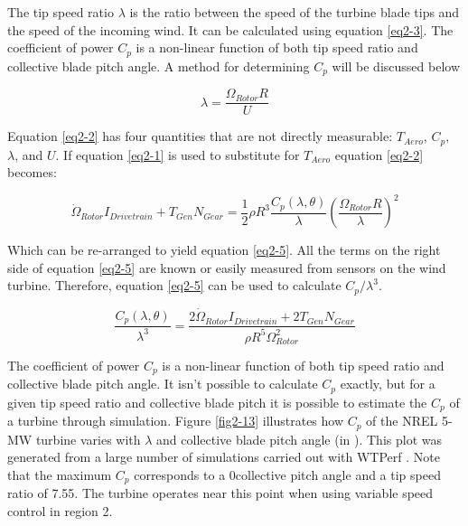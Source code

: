 The tip speed ratio $\lambda$ is the ratio between the speed of the turbine blade tips and the speed of the incoming wind. It can be calculated using equation \ref{eq2-3}. The coefficient of power $C_p$ is a non-linear function of both tip speed ratio and collective blade pitch angle. A method for determining $C_p$ will be discussed below

\begin{equation}
	\lambda=\frac{\Omega_{Rotor} R}{U} \label{eq2-3}
\end{equation}

Equation \ref{eq2-2} has four quantities that are not directly measurable: $T_{Aero}$, $C_p,$ $\lambda$, and $U$. If equation \ref{eq2-1} is used to substitute for $T_{Aero}$ equation \ref{eq2-2} becomes:

\begin{equation}
	\dot{\Omega }_{Rotor} I_{Drivetrain} + T_{Gen} N_{Gear} = \frac{1}{2} \rho R^3 \frac{C_p ( \lambda , \theta )}{\lambda} \left(\frac{\Omega_{Rotor} R}{\lambda}\right)^2   \label{eq2-4}
\end{equation}

Which can be re-arranged to yield equation \ref{eq2-5}. All the terms on the right side of equation \ref{eq2-5} are known or easily measured from sensors on the wind turbine. Therefore, equation \ref{eq2-5} can be used to calculate $C_p / \lambda^3$.

\begin{equation}
	 \frac{C_p ( \lambda, \theta)}{\lambda^3} = \frac{2 \dot{\Omega}_{Rotor} I_{Drivetrain} + 2 T_{Gen} N_{Gear}}{\rho R^5 \Omega^2_{Rotor}} \label{eq2-5}
\end{equation}


The coefficient of power $C_p$ is a non-linear function of both tip speed ratio and collective blade pitch angle. It isn$’$t possible to calculate $C_p$ exactly, but for a given tip speed ratio and collective blade pitch it is possible to estimate the $C_p$ of a turbine through simulation.  Figure \ref{fig2-13} illustrates how $C_p$ of the NREL 5-MW turbine varies with $\lambda$ and collective blade pitch angle (in \degree). This plot was generated from a large number of simulations carried out with WTPerf \cite{platt2012}. Note that the maximum $C_p$ corresponds to a 0\degree collective pitch angle and a tip speed ratio of 7.55. The turbine operates near this point when using variable speed control in region 2. 

